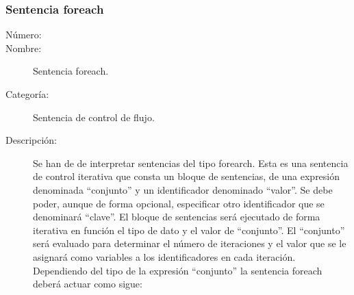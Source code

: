 \subsubsection{Sentencia foreach}
\begin{framed}
	\begin{description}
		\item [Número:] \cn
		\item [Nombre:] Sentencia foreach.
		\item [Categoría:] Sentencia de control de flujo.
		\item [Descripción:] Se han de de interpretar sentencias del tipo forearch. Esta es una sentencia de control
		iterativa que consta un bloque de sentencias, de una expresión denominada ``conjunto'' y  un identificador denominado ``valor''.
		Se debe poder, aunque de forma opcional, especificar otro identificador que se denominará ``clave''.
		El bloque de sentencias será ejecutado de forma iterativa en función el tipo de dato y el valor de ``conjunto''.  El ``conjunto''
		será evaluado para determinar el número de iteraciones y el valor que se le asignará como variables a los identificadores en
		cada iteración. Dependiendo del tipo de la expresión ``conjunto'' la sentencia foreach deberá actuar como sigue:
		

\end{description}
\end{framed}
